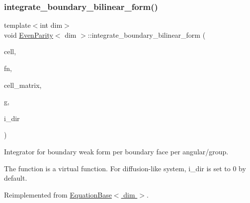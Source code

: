 \subsubsection{\texorpdfstring{integrate\+\_\+boundary\+\_\+bilinear\+\_\+form()}{integrate\_boundary\_bilinear\_form()}}
{\footnotesize\ttfamily template$<$int dim$>$ \\
void \hyperlink{class_even_parity}{Even\+Parity}$<$ dim $>$\+::integrate\+\_\+boundary\+\_\+bilinear\+\_\+form (\begin{DoxyParamCaption}\item[{typename Do\+F\+Handler$<$ dim $>$\+::active\+\_\+cell\+\_\+iterator \&}]{cell,  }\item[{unsigned int \&}]{fn,  }\item[{Full\+Matrix$<$ double $>$ \&}]{cell\+\_\+matrix,  }\item[{const unsigned int \&}]{g,  }\item[{const unsigned int \&}]{i\+\_\+dir }\end{DoxyParamCaption})\hspace{0.3cm}{\ttfamily [virtual]}}



Integrator for boundary weak form per boundary face per angular/group. 

The function is a virtual function. For diffusion-\/like system, i\+\_\+dir is set to 0 by default. 

Reimplemented from \hyperlink{class_equation_base_ae294806284f671619cac9e7169ffff8d}{Equation\+Base$<$ dim $>$}.

\mbox{\label{class_even_parity_adb381ea4f45e5ae3741b1d30a0de02b6}} 
